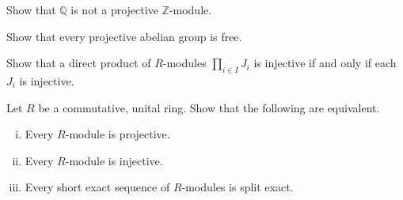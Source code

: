 \documentclass{problemset}
\begin{document}
\begin{exercise} Show that \(\mathbb{Q}\) is not a projective \(\mathbb{Z}\)-module.
\end{exercise}


\begin{exercise} Show that every projective abelian group is free.
\end{exercise}


\begin{exercise} Show that a direct product of \(R\)-modules \(\prod _{i \in I} J_i\)  is injective if and only if each \(J_i\) is injective.
\end{exercise}






\begin{exercise} Let \(R\) be a commutative, unital ring.  Show that the following are equivalent.
\begin{enumerate}[(i)]
\item Every \(R\)-module is projective.
\item Every \(R\)-module is injective.
\item Every short exact sequence of \(R\)-modules is split exact.
\end{enumerate}
\end{exercise}




\end{document}
